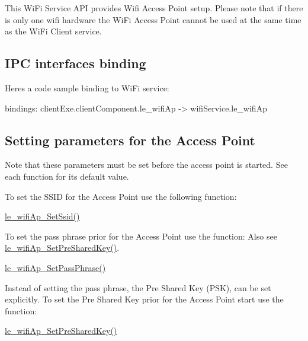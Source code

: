 This Wi\+Fi Service A\+PI provides Wifi Access Point setup. Please note that if there is only one wifi hardware the Wi\+Fi Access Point cannot be used at the same time as the Wi\+Fi Client service.\hypertarget{c_le_wifi_client_le_wifi_binding}{}\subsection{I\+P\+C interfaces binding}\label{c_le_wifi_client_le_wifi_binding}
Here\textquotesingle{}s a code sample binding to Wi\+Fi service\+: \begin{DoxyVerb}bindings:
{
   clientExe.clientComponent.le_wifiAp -> wifiService.le_wifiAp
}
\end{DoxyVerb}
\hypertarget{c_le_wifi_ap_le_wifiAp_connect_to_ap}{}\subsection{Setting parameters for the Access Point}\label{c_le_wifi_ap_le_wifiAp_connect_to_ap}
Note that these parameters must be set before the access point is started. See each function for its default value.

To set the S\+S\+ID for the Access Point use the following function\+:
\begin{DoxyItemize}
\item \hyperlink{le__wifi_ap__interface_8h_a0f29690f2a2d01157cc2d9e58d1d5536}{le\+\_\+wifi\+Ap\+\_\+\+Set\+Ssid()}
\end{DoxyItemize}

To set the pass phrase prior for the Access Point use the function\+: Also see \hyperlink{le__wifi_ap__interface_8h_a9d126d5511dae79d2229c48bbcc4dddc}{le\+\_\+wifi\+Ap\+\_\+\+Set\+Pre\+Shared\+Key()}.
\begin{DoxyItemize}
\item \hyperlink{le__wifi_ap__interface_8h_a8be6c0c7aad3e14f492898df6f131c5b}{le\+\_\+wifi\+Ap\+\_\+\+Set\+Pass\+Phrase()}
\end{DoxyItemize}

Instead of setting the pass phrase, the Pre Shared Key (P\+SK), can be set explicitly. To set the Pre Shared Key prior for the Access Point start use the function\+:
\begin{DoxyItemize}
\item \hyperlink{le__wifi_ap__interface_8h_a9d126d5511dae79d2229c48bbcc4dddc}{le\+\_\+wifi\+Ap\+\_\+\+Set\+Pre\+Shared\+Key()}
\end{DoxyItemize}

